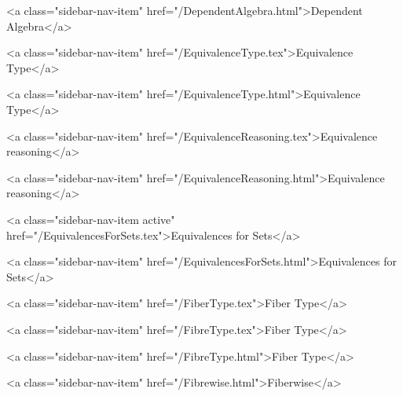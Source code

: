       
    
      
        
          <a class="sidebar-nav-item" href="/DependentAlgebra.html">Dependent Algebra</a>
        
      
    
      
        
          <a class="sidebar-nav-item" href="/EquivalenceType.tex">Equivalence Type</a>
        
      
    
      
        
          <a class="sidebar-nav-item" href="/EquivalenceType.html">Equivalence Type</a>
        
      
    
      
        
          <a class="sidebar-nav-item" href="/EquivalenceReasoning.tex">Equivalence reasoning</a>
        
      
    
      
        
          <a class="sidebar-nav-item" href="/EquivalenceReasoning.html">Equivalence reasoning</a>
        
      
    
      
        
          <a class="sidebar-nav-item active" href="/EquivalencesForSets.tex">Equivalences for Sets</a>
        
      
    
      
        
          <a class="sidebar-nav-item" href="/EquivalencesForSets.html">Equivalences for Sets</a>
        
      
    
      
        
          <a class="sidebar-nav-item" href="/FiberType.tex">Fiber Type</a>
        
      
    
      
        
          <a class="sidebar-nav-item" href="/FibreType.tex">Fiber Type</a>
        
      
    
      
        
          <a class="sidebar-nav-item" href="/FibreType.html">Fiber Type</a>
        
      
    
      
        
          <a class="sidebar-nav-item" href="/Fibrewise.html">Fiberwise</a>
        
